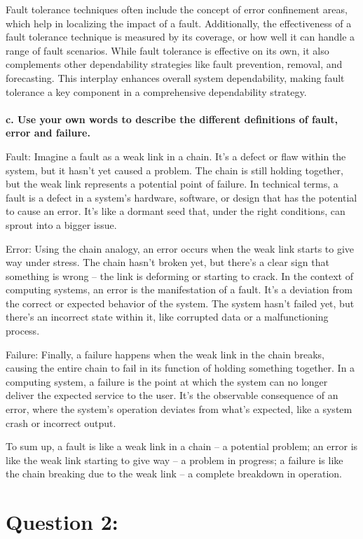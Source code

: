 \documentclass[12pt]{article}
\numberwithin{table}{section}
\begin{document}
Fault tolerance techniques often include the concept of error confinement areas, which help in localizing the impact of a fault. Additionally, the effectiveness of a fault tolerance technique is measured by its coverage, or how well it can handle a range of fault scenarios. While fault tolerance is effective on its own, it also complements other dependability strategies like fault prevention, removal, and forecasting. This interplay enhances overall system dependability, making fault tolerance a key component in a comprehensive dependability strategy.\\
\\
\textbf{c. Use your own words to describe the different definitions of fault, error and failure.}

Fault: Imagine a fault as a weak link in a chain. It's a defect or flaw within the system, but it hasn't yet caused a problem. The chain is still holding together, but the weak link represents a potential point of failure. In technical terms, a fault is a defect in a system's hardware, software, or design that has the potential to cause an error. It's like a dormant seed that, under the right conditions, can sprout into a bigger issue.

Error: Using the chain analogy, an error occurs when the weak link starts to give way under stress. The chain hasn't broken yet, but there's a clear sign that something is wrong – the link is deforming or starting to crack. In the context of computing systems, an error is the manifestation of a fault. It's a deviation from the correct or expected behavior of the system. The system hasn't failed yet, but there's an incorrect state within it, like corrupted data or a malfunctioning process.

Failure: Finally, a failure happens when the weak link in the chain breaks, causing the entire chain to fail in its function of holding something together. In a computing system, a failure is the point at which the system can no longer deliver the expected service to the user. It's the observable consequence of an error, where the system's operation deviates from what's expected, like a system crash or incorrect output.

To sum up, a fault is like a weak link in a chain – a potential problem; an error is like the weak link starting to give way – a problem in progress; a failure is like the chain breaking due to the weak link – a complete breakdown in operation.

\section*{Question 2: } 
\end{document}
